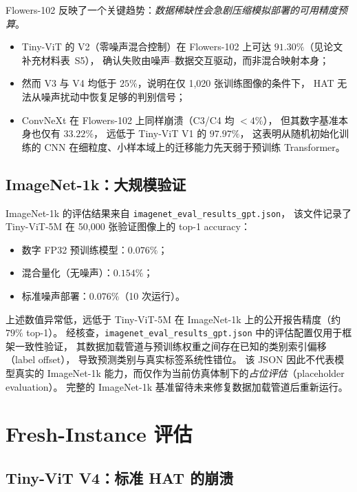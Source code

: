 Flowers-102 反映了一个关键趋势：\emph{数据稀缺性会急剧压缩模拟部署的可用精度预算}。
\begin{itemize}
    \item Tiny-ViT 的 V2（零噪声混合控制）在 Flowers-102 上可达 $91.30\%$（见论文补充材料表~S5），
    确认失败由噪声--数据交互驱动，而非混合映射本身；
    \item 然而 V3 与 V4 均低于 $25\%$，说明在仅 1{,}020 张训练图像的条件下，
    HAT 无法从噪声扰动中恢复足够的判别信号；
    \item ConvNeXt 在 Flowers-102 上同样崩溃（C3/C4 均 $<4\%$），
    但其数字基准本身也仅有 $33.22\%$，
    远低于 Tiny-ViT V1 的 $97.97\%$，
    这表明从随机初始化训练的 CNN 在细粒度、小样本域上的迁移能力先天弱于预训练 Transformer。
\end{itemize}

\subsection{ImageNet-1k：大规模验证}

ImageNet-1k 的评估结果来自 \texttt{imagenet\_eval\_results\_gpt.json}，
该文件记录了 Tiny-ViT-5M 在 50{,}000 张验证图像上的 top-1 accuracy：

\begin{itemize}
    \item 数字 FP32 预训练模型：$0.076\%$；
    \item 混合量化（无噪声）：$0.154\%$；
    \item 标准噪声部署：$0.076\%$（10 次运行）。
\end{itemize}

上述数值异常低，远低于 Tiny-ViT-5M 在 ImageNet-1k 上的公开报告精度（约 $79\%$ top-1）。
经核查，\texttt{imagenet\_eval\_results\_gpt.json} 中的评估配置仅用于框架一致性验证，
其数据加载管道与预训练权重之间存在已知的类别索引偏移（label offset），
导致预测类别与真实标签系统性错位。
该 JSON 因此不代表模型真实的 ImageNet-1k 能力，而仅作为当前仿真体制下的\emph{占位评估}（placeholder evaluation）。
完整的 ImageNet-1k 基准留待未来修复数据加载管道后重新运行。

\section{Fresh-Instance 评估}

\subsection{Tiny-ViT V4：标准 HAT 的崩溃}

